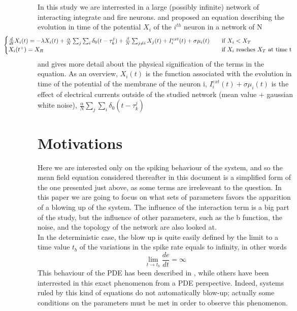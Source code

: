 	In this study we are interrested in a large (possibly infinite) network of interacting integrate and fire neurons. \cite{lewis_dynamics_2003} and \cite{ostojic_synchronization_2009} proposed an equation describing the evolution in time of the potential $X_i$ of the $i^{th}$ neuron in a network of N
		\begin{equation}
			\hspace*{-2cm} \begin{cases}
				\frac{d}{dt}X_i(t)=-\lambda X_i(t)+\frac{\alpha}{N}\sum_j\sum_i\delta_0(t-\tau_k^j)+\frac{\beta}{N}\sum_{j\neq i}X_j(t)+I_i^{ext}(t)+\sigma\mu_i(t) &\quad\text{if }X_i<X_T\\
				X_i(t^+)=X_R & \quad\text{if }X_i\text{ reaches }X_T\text{ at time t}\\
			\end{cases}
		\end{equation}
	\cite{ostojic_synchronization_2009} and \cite{delarue:hal-00747565} gives more detail about the physical signification of the terms in the equation. As an overview, $X_i(t)$ is the function associated with the evolution in time of the potential of the membrane of the neuron i, $I_i^{ext}(t)+\sigma\mu_i(t)$ is the effect of electrical currents outside of the studied network (mean value + gaussian white noise), $\frac{\alpha}{N}\sum_j\sum_i\delta_0(t-\tau_k^j)$ 

	\section{Motivations}
	Here we are interested only on the spiking behaviour of the system, and so the mean field equation considered thereafter in this document is a simplified form of the one presented just above, as some terms are irreleveant to the question.
	In this paper we are going to focus on what sets of parameters favors the apparition of a blowing up of the system. The influence of the interaction term is a big part of the study, but the influence of other parameters, such as the b function, the noise, and the topology of the network are also looked at.\\
	In the deterministic case, the blow up is quite easily defined by the limit to a time value $t_b$ of the variations in the spike rate equals to infinity, in other words
	\begin{equation}
		\lim_{t\rightarrow t_b}\frac{de}{dt}=\infty
	\end{equation}
	This behaviour of the PDE has been described in \cite{delarue:hal-00747565}, while others have been interrested in this exact phenomenon from a PDE perspective. Indeed, systems ruled by this kind of equations do not automatically blow-up; actually some conditions on the parameters must be met in order to observe this phenomenon.

